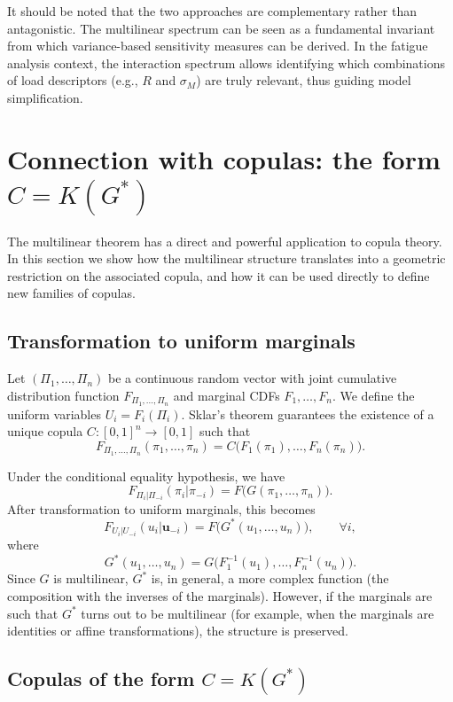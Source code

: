 It should be noted that the two approaches are complementary rather than antagonistic. The multilinear spectrum can be seen as a fundamental invariant from which variance-based sensitivity measures can be derived. In the fatigue analysis context, the interaction spectrum allows identifying which combinations of load descriptors (e.g., \(R\) and \(\sigma_M\)) are truly relevant, thus guiding model simplification.

\section{Connection with copulas: the form \(C = K(G^*)\)}
\label{sec:copula-connection}

The multilinear theorem has a direct and powerful application to copula theory. In this section we show how the multilinear structure translates into a geometric restriction on the associated copula, and how it can be used directly to define new families of copulas.

\subsection{Transformation to uniform marginals}

Let \((\Pi_1,\ldots,\Pi_n)\) be a continuous random vector with joint cumulative distribution function \(F_{\Pi_1,\ldots,\Pi_n}\) and marginal CDFs \(F_1,\ldots,F_n\). We define the uniform variables \(U_i = F_i(\Pi_i)\). Sklar's theorem guarantees the existence of a unique copula \(C:[0,1]^n\to[0,1]\) such that
\[
F_{\Pi_1,\ldots,\Pi_n}(\pi_1,\ldots,\pi_n) = C\bigl(F_1(\pi_1),\ldots,F_n(\pi_n)\bigr).
\]

Under the conditional equality hypothesis, we have
\[
F_{\Pi_i|\Pi_{-i}}(\pi_i|\pi_{-i}) = F\bigl(G(\pi_1,\ldots,\pi_n)\bigr).
\]
After transformation to uniform marginals, this becomes
\[
F_{U_i|U_{-i}}(u_i|\mathbf{u}_{-i}) = F\bigl(G^*(u_1,\ldots,u_n)\bigr), \qquad \forall i,
\]
where
\[
G^*(u_1,\ldots,u_n) = G\bigl(F_1^{-1}(u_1),\ldots,F_n^{-1}(u_n)\bigr).
\]
Since \(G\) is multilinear, \(G^*\) is, in general, a more complex function (the composition with the inverses of the marginals). However, if the marginals are such that \(G^*\) turns out to be multilinear (for example, when the marginals are identities or affine transformations), the structure is preserved.

\subsection{Copulas of the form \(C = K(G^*)\)}


